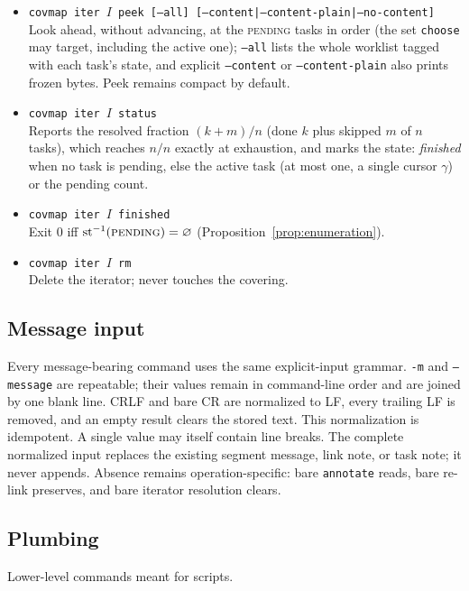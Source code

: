 \documentclass[11pt,a4paper]{article}
\begin{document}
\begin{itemize}[leftmargin=2em,itemsep=2pt]
      (default: the cursor's task).
\item \texttt{covmap iter $I$ peek [--all]
      [--content|--content-plain|--no-content]}\\
      Look ahead, without advancing, at the \textsc{pending} tasks in order
      (the set \texttt{choose} may target, including the active one);
      \texttt{--all} lists the whole worklist tagged with each task's state,
      and explicit \texttt{--content} or \texttt{--content-plain} also prints
      frozen bytes. Peek remains compact by default.
\item \texttt{covmap iter $I$ status}\\
      Reports the resolved fraction $(k+m)/n$ (done $k$ plus skipped $m$ of
      $n$ tasks), which reaches $n/n$ exactly at exhaustion, and marks the
      state: \emph{finished} when no task is pending, else the active task
      (at most one, a single cursor $\gamma$) or the pending count.
\item \texttt{covmap iter $I$ finished}\\
      Exit $0$ iff $\mathrm{st}^{-1}(\textsc{pending}) = \varnothing$
      (Proposition~\ref{prop:enumeration}).
\item \texttt{covmap iter $I$ rm}\\
      Delete the iterator; never touches the covering.
\end{itemize}

\subsection{Message input}

Every message-bearing command uses the same explicit-input grammar.
\texttt{-m} and \texttt{--message} are repeatable; their values remain in
command-line order and are joined by one blank line. CRLF and bare CR are
normalized to LF, every trailing LF is removed, and an empty result clears
the stored text. This normalization is idempotent. A single value may itself
contain line breaks. The complete normalized input replaces the existing
segment message, link note, or task note; it never appends. Absence remains
operation-specific: bare \texttt{annotate} reads, bare re-link preserves, and
bare iterator resolution clears.

\subsection{Plumbing}

Lower-level commands meant for scripts.
\end{document}
